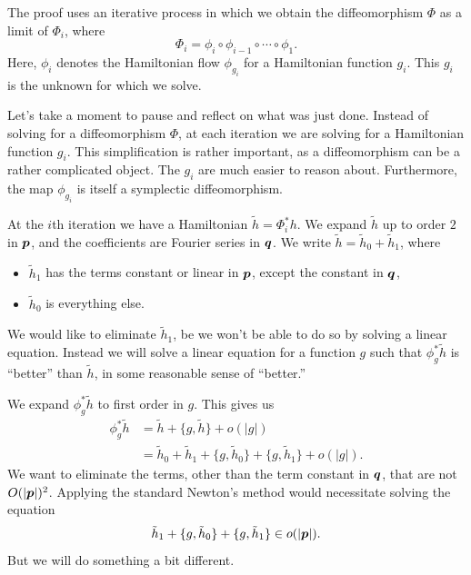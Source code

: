 \documentclass[twoside,letterpaper,10pt]{article}
\numberwithin{equation}{section}
\begin{document}
The proof uses an iterative process in which we obtain the diffeomorphism $\Phi$
as a limit of $\Phi_i$, where
\begin{equation*}
  \Phi_i = \phi_i \circ \phi_{i - 1} \circ \cdots \circ \phi_1.
\end{equation*}
Here, $\phi_i$ denotes the Hamiltonian flow $\phi_{g_i}$ for a Hamiltonian
function $g_i$.
This $g_i$ is the unknown for which we solve.

Let's take a moment to pause and reflect on what was just done.
Instead of solving for a diffeomorphism $\Phi$, at each iteration we are solving
for a Hamiltonian function $g_i$.
This simplification is rather important, as a diffeomorphism can be a rather
complicated object.
The $g_i$ are much easier to reason about.
Furthermore, the map $\phi_{g_i}$ is itself a symplectic diffeomorphism.

At the $i$th iteration we have a Hamiltonian $\tilde{h} = \Phi_i^* h$.
We expand $\tilde{h}$ up to order $2$ in $\bm{p}$, and the coefficients are
Fourier series in $\bm{q}$.
We write $\tilde{h} = \tilde{h}_0 + \tilde{h}_1$, where
\begin{itemize}
\item $\tilde{h}_1$ has the terms constant or linear in $\bm{p}$, except the
  constant in $\bm{q}$,
\item $\tilde{h}_0$ is everything else.
\end{itemize}
We would like to eliminate $\tilde{h}_1$, be we won't be able to do so by
solving a linear equation.
Instead we will solve a linear equation for a function $g$ such that
$\phi_g^*\tilde{h}$ is ``better'' than $\tilde{h}$, in some reasonable sense of
``better.''

We expand $\phi_g^* \tilde{h}$ to first order in $g$.
This gives us
\begin{align*}
  \phi_g^* \tilde{h} &= \tilde{h} + \{g, \tilde{h}\} + o(|g|)\\
                     &= \tilde{h}_0 + \tilde{h}_1 + \{g, \tilde{h}_0\} + \{g,
                       \tilde{h}_1\} + o(|g|).
\end{align*}
We want to eliminate the terms, other than the term constant in $\bm{q}$, that
are not $O(|\bm{p}|)^2$.
Applying the standard Newton's method would necessitate solving the equation
\begin{equation*}
  \tilde{h}_1 + \{g, \tilde{h}_0\} + \{g, \tilde{h}_1\} \in o(|\bm{p}|).
\end{equation*}
But we will do something a bit different.
\end{document}

